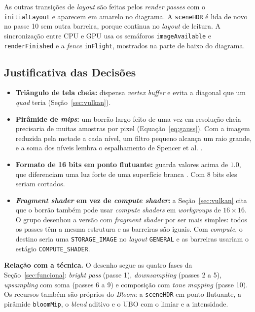 As outras transições de \textit{layout} são feitas pelos \textit{render passes} com o \texttt{initialLayout} e aparecem em amarelo no diagrama. A \texttt{sceneHDR} é lida de novo no passe 10 sem outra barreira, porque continua no \textit{layout} de leitura. A sincronização entre CPU e GPU usa os semáforos \texttt{imageAvailable} e \texttt{renderFinished} e a \textit{fence} \texttt{inFlight}, mostrados na parte de baixo do diagrama.

\subsection{Justificativa das Decisões}
\begin{itemize}
    \setlength{\itemsep}{0pt}
    \item \textbf{Triângulo de tela cheia:} dispensa \textit{vertex buffer} e evita a diagonal que um \textit{quad} teria (Seção~\ref{sec:vulkan}).
    \item \textbf{Pirâmide de \textit{mips}:} um borrão largo feito de uma vez em resolução cheia precisaria de muitas amostras por pixel (Equação~\ref{eq:gauss}). Com a imagem reduzida pela metade a cada nível, um filtro pequeno alcança um raio grande, e a soma dos níveis lembra o espalhamento de Spencer et al. \cite{spencer1995glare}.
    \item \textbf{Formato de 16 bits em ponto flutuante:} guarda valores acima de $1.0$, que diferenciam uma luz forte de uma superfície branca \cite{seetzen2004hdr}. Com 8 bits eles seriam cortados.
    \item \textbf{\textit{Fragment shader} em vez de \textit{compute shader}:} a Seção~\ref{sec:vulkan} cita que o borrão também pode usar \textit{compute shaders} em \textit{workgroups} de $16 \times 16$. O grupo desenhou a versão com \textit{fragment shader} por ser mais simples: todos os passes têm a mesma estrutura e as barreiras são iguais. Com \textit{compute}, o destino seria uma \texttt{STORAGE\_IMAGE} no \textit{layout} \texttt{GENERAL} e as barreiras usariam o estágio \texttt{COMPUTE\_SHADER}.
\end{itemize}
\textbf{Relação com a técnica.} O desenho segue as quatro fases da Seção~\ref{sec:funciona}: \textit{bright pass} (passe 1), \textit{downsampling} (passes 2 a 5), \textit{upsampling} com soma (passes 6 a 9) e composição com \textit{tone mapping} (passe 10). Os recursos também são próprios do \textit{Bloom}: a \texttt{sceneHDR} em ponto flutuante, a pirâmide \texttt{bloomMip}, o \textit{blend} aditivo e o UBO com o limiar e a intensidade.
\fussy
